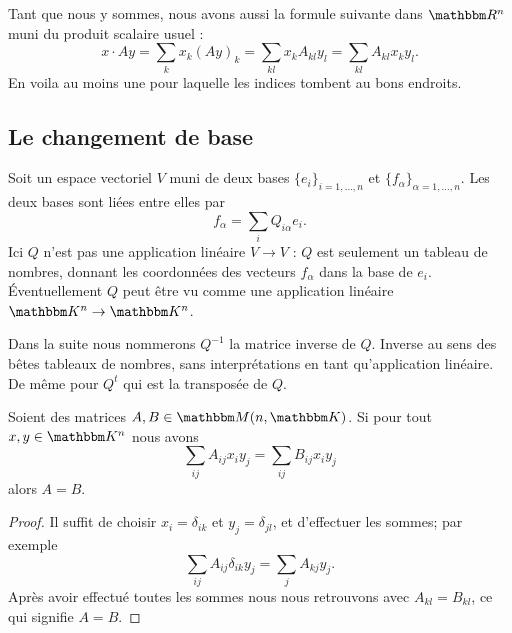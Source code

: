 Tant que nous y sommes, nous avons aussi la formule suivante dans \( \eR^n\) muni du produit scalaire usuel :
\begin{equation}        \label{EQooFYNYooFQhVyE}
    x\cdot Ay=\sum_kx_k(Ay)_k=\sum_{kl}x_kA_{kl}y_l=\sum_{kl}A_{kl}x_ky_l.
\end{equation}
En voila au moins une pour laquelle les indices tombent au bons endroits.

\subsection{Le changement de base}

Soit un espace vectoriel \( V\) muni de deux bases \( \{ e_i\}_{i=1,\ldots, n}\) et \( \{ f_{\alpha}\}_{\alpha=1,\ldots, n}\). Les deux bases sont liées entre elles par
\begin{equation}        \label{EQooFRQRooSMsQQB}
    f_{\alpha}=\sum_iQ_{i\alpha}e_i.
\end{equation}
Ici \( Q\) n'est pas une application linéaire \( V\to V\) : \( Q\) est seulement un tableau de nombres, donnant les coordonnées des vecteurs \( f_{\alpha}\) dans la base de \( e_i\). Éventuellement \( Q\) peut être vu comme une application linéaire \( \eK^n\to \eK^n\).

Dans la suite nous nommerons \( Q^{-1}\) la matrice inverse de \( Q\). Inverse au sens des bêtes tableaux de nombres, sans interprétations en tant qu'application linéaire. De même pour \( Q^t\) qui est la transposée de \( Q\).

\begin{lemma}       \label{LEMooLXAHooPRyHaF}
    Soient des matrices \( A,B\in \eM(n,\eK)\). Si pour tout \( x,y\in \eK^n\) nous avons
    \begin{equation}
        \sum_{ij}A_{ij}x_iy_j=\sum_{ij}B_{ij}x_iy_j
    \end{equation}
    alors \( A=B\).
\end{lemma}

\begin{proof}
    Il suffit de choisir \( x_i=\delta_{ik}\) et \( y_j=\delta_{jl}\), et d'effectuer les sommes; par exemple
    \begin{equation}
        \sum_{ij}A_{ij}\delta_{ik}y_j=\sum_jA_{kj}y_j.
    \end{equation}
    Après avoir effectué toutes les sommes nous nous retrouvons avec \( A_{kl}=B_{kl}\), ce qui signifie \( A=B\).
\end{proof}

